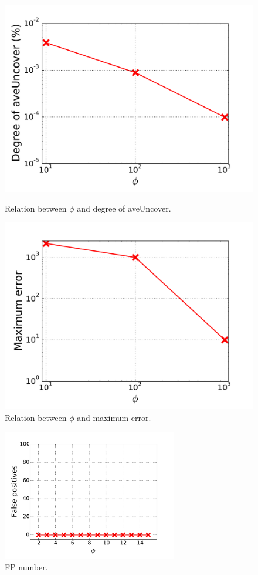 \begin{figure}[!htb]
  \includegraphics[width=\linewidth]{figure/aveUncover.pdf}
  \caption{Relation between $\phi$ and degree of aveUncover.}
  \label{fig:aveUncover}
\endminipage\hfill
{}%
  \includegraphics[width=\linewidth]{figure/maxError.pdf}
  \caption{Relation between $\phi$ and maximum error.}
  \label{fig:maxError}

\endminipage
\end{figure}

\begin{figure}[t!]
\begin{center}
\includegraphics[width=3.0in]{figure/fp}
\caption{FP number.}
\label{fig:new}
\end{center}
\end{figure}

